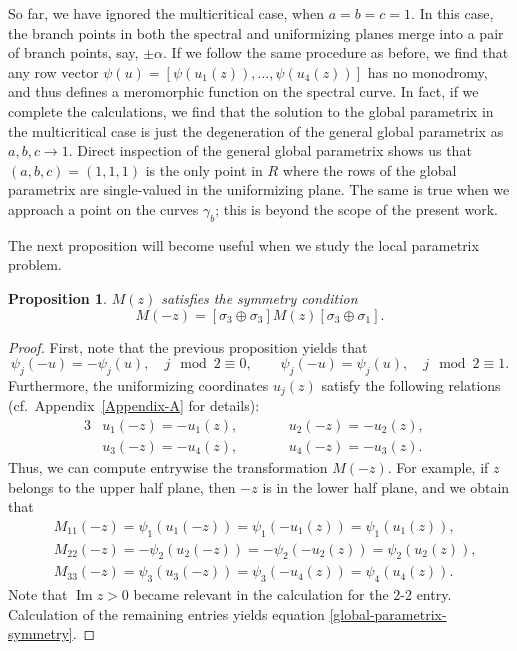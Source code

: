 \documentclass[pdftex]{sigma}
\numberwithin{equation}{section}
\newtheorem{Proposition}[Theorem]{Proposition}
 { \theoremstyle{definition}
\newtheorem{Definition}[Theorem]{Definition}
\newtheorem{Note}[Theorem]{Note}
\newtheorem{Example}[Theorem]{Example}
\newtheorem{Remark}[Theorem]{Remark} }
\begin{document}
\begin{Remark}
 So far, we have ignored the multicritical case, when $a=b=c=1$. In this case, the branch points in both the spectral and uniformizing planes merge into a pair of branch points, say, $\pm \alpha$. If we follow the same procedure as before, we find that any row vector ${\psi(u) = [\psi(u_1(z)), \dots, \psi(u_4(z))]}$ has no monodromy, and thus defines a meromorphic function on the spectral curve. In fact, if we complete the calculations, we find that the solution to the global parametrix in the multicritical case is just the degeneration of the general global parametrix as~${a,b,c\to 1}$. Direct inspection of the general global parametrix shows us that~${(a,b,c) = (1,1,1)}$ is the only point in $R$ where the rows of the global parametrix are single-valued in the uniformizing plane. The same is true when we approach a point on the curves $\gamma_b$; this is beyond the scope of the present work.
\end{Remark}
The next proposition will become useful when we study the local parametrix problem.
\begin{Proposition}\label{global-parametrix-prop}
 $M(z)$ satisfies the symmetry condition
 \begin{equation} \label{global-parametrix-symmetry}
 M(-z) = \left[\sigma_3 \oplus \sigma_3 \right] M(z) [\sigma_3 \oplus \sigma_1].
 \end{equation}
\end{Proposition}
\begin{proof}
 First, note that the previous proposition yields that
 \begin{equation*}
 \psi_j(-u) = -\psi_j(u), \quad j \mod 2 \equiv 0, \qquad \psi_j(-u) = \psi_j(u), \quad j \mod 2 \equiv 1.
 \end{equation*}
 Furthermore, the uniformizing coordinates $u_j(z)$ satisfy the following relations (cf.\ Appendix~\ref{Appendix-A} for details):
 \begin{alignat*}{3}
 &u_1(-z) = -u_1(z), \qquad&& u_2(-z) = -u_2(z),&\\
 &u_3(-z) = -u_4(z), \qquad&& u_4(-z) = -u_3(z).&
 \end{alignat*}
 Thus, we can compute entrywise the transformation $M(-z)$. For example, if $z$ belongs to the upper half plane, then $-z$ is in the lower half plane, and we obtain that
 \begin{align*}
 &M_{11}(-z)= \psi_1(u_1(-z)) = \psi_1(-u_1(z)) = \psi_1(u_1(z)),\\
 &M_{22}(-z)= -\psi_2(u_2(-z)) = -\psi_2(-u_2(z)) = \psi_2(u_2(z)),\\
 &M_{33}(-z)= \psi_3(u_3(-z)) = \psi_3(-u_4(z)) = \psi_4(u_4(z)).
 \end{align*}
 Note that $\operatorname{Im} z > 0$ became relevant in the calculation for the 2-2 entry.
 Calculation of the remaining entries yields equation \eqref{global-parametrix-symmetry}.
\end{proof}
\end{document}
